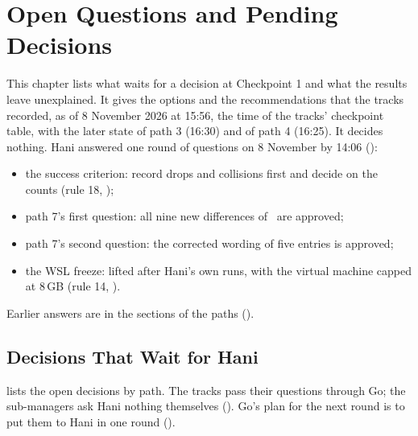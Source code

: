 
\chapter{Open Questions and Pending Decisions}
\label{ch:open-questions}

This chapter lists what waits for a decision at Checkpoint 1 and what the results
leave unexplained. It gives the options and the recommendations that the tracks
recorded, as of 8 November 2026 at 15:56, the time of the tracks' checkpoint table, with the later state of path 3 (16:30) and of path 4 (16:25). It
decides nothing. Hani answered one round of questions on 8 November by 14:06
():
\begin{itemize}
  \item the success criterion: record drops and collisions first and decide on the
  counts (rule 18, );
  \item path 7's first question: all nine new differences of \cuncert\ are approved;
  \item path 7's second question: the corrected wording of five entries is approved;
  \item the WSL freeze: lifted after Hani's own runs, with the virtual machine capped
  at 8\,GB (rule 14, ).
\end{itemize}
Earlier answers are in the sections of the paths ().

\section{Decisions That Wait for Hani}
\label{sec:pending}

 lists the open decisions by path. The tracks pass their questions
through Go; the sub-managers ask Hani nothing themselves (). Go's plan for the next
round is to put them to Hani in one round ().

